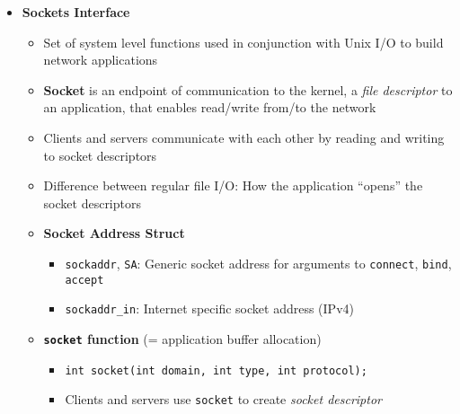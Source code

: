 \documentclass[12pt]{article}
\begin{document}
{\begin{itemize}
\begin{itemize}
\begin{itemize}
		\end{itemize}
		\item A \textbf{socket} is an endpoint of a connection
		\item Socket address: \texttt{IPaddress:port} pair
		\item \textbf{Port} is a 16-bit int that identifies a process
		\begin{itemize}
			\item Ephemeral Port: Assigned automatically by client kernel when client makes a connection request
			\item Well-known Port: Associated with some \textit{service} provided by a server (ex. 80-http, 22-ssh ...)
		\end{itemize}
		\item A connection is uniquely identified by the socket address of its endpoints (\textbf{socket pair}) \texttt{(clientaddr:clientport, serveraddr:serverport)}
	\end{itemize}
	\item \textbf{Sockets Interface}
	\begin{itemize}
		\item Set of system level functions used in conjunction with Unix I/O to build network applications
		\item \textbf{Socket} is an endpoint of communication to the kernel, a \textit{file descriptor} to an application, that enables read/write from/to the network
		\item Clients and servers communicate with each other by reading and writing to socket descriptors
		\item Difference between regular file I/O: How the application ``opens'' the socket descriptors
		\item \textbf{Socket Address Struct} 
		\begin{itemize}
			\item \texttt{sockaddr}, \texttt{SA}: Generic socket address for arguments to \texttt{connect}, \texttt{bind}, \texttt{accept}
			\item \texttt{sockaddr\_in}: Internet specific socket address (IPv4)
		\end{itemize}
		\item \textbf{\texttt{socket} function} (= application buffer allocation)
		\begin{itemize}
			\item \texttt{int socket(int domain, int type, int protocol);}
			\item Clients and servers use \texttt{socket} to create \textit{socket descriptor}

\end{itemize}
\end{itemize}
\end{itemize}}
\end{document}
